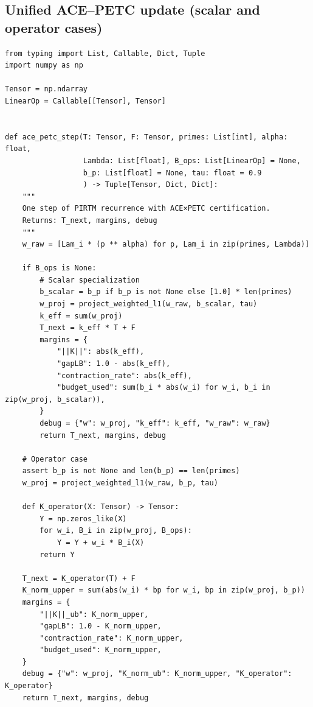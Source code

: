 \documentclass[11pt]{article}
\theoremstyle{definition}
\theoremstyle{remark}
\newcommand{\1}{\mathbf{1}}
\begin{document}
\subsection{Unified ACE--PETC update (scalar and operator cases)}
\begin{lstlisting}[style=py,caption={One PIRTM step with ACE×PETC certification}]
from typing import List, Callable, Dict, Tuple
import numpy as np

Tensor = np.ndarray
LinearOp = Callable[[Tensor], Tensor]


def ace_petc_step(T: Tensor, F: Tensor, primes: List[int], alpha: float,
                  Lambda: List[float], B_ops: List[LinearOp] = None,
                  b_p: List[float] = None, tau: float = 0.9
                  ) -> Tuple[Tensor, Dict, Dict]:
    """
    One step of PIRTM recurrence with ACE×PETC certification.
    Returns: T_next, margins, debug
    """
    w_raw = [Lam_i * (p ** alpha) for p, Lam_i in zip(primes, Lambda)]

    if B_ops is None:
        # Scalar specialization
        b_scalar = b_p if b_p is not None else [1.0] * len(primes)
        w_proj = project_weighted_l1(w_raw, b_scalar, tau)
        k_eff = sum(w_proj)
        T_next = k_eff * T + F
        margins = {
            "||K||": abs(k_eff),
            "gapLB": 1.0 - abs(k_eff),
            "contraction_rate": abs(k_eff),
            "budget_used": sum(b_i * abs(w_i) for w_i, b_i in zip(w_proj, b_scalar)),
        }
        debug = {"w": w_proj, "k_eff": k_eff, "w_raw": w_raw}
        return T_next, margins, debug

    # Operator case
    assert b_p is not None and len(b_p) == len(primes)
    w_proj = project_weighted_l1(w_raw, b_p, tau)

    def K_operator(X: Tensor) -> Tensor:
        Y = np.zeros_like(X)
        for w_i, B_i in zip(w_proj, B_ops):
            Y = Y + w_i * B_i(X)
        return Y

    T_next = K_operator(T) + F
    K_norm_upper = sum(abs(w_i) * bp for w_i, bp in zip(w_proj, b_p))
    margins = {
        "||K||_ub": K_norm_upper,
        "gapLB": 1.0 - K_norm_upper,
        "contraction_rate": K_norm_upper,
        "budget_used": K_norm_upper,
    }
    debug = {"w": w_proj, "K_norm_ub": K_norm_upper, "K_operator": K_operator}
    return T_next, margins, debug
\end{lstlisting}
\end{document}
